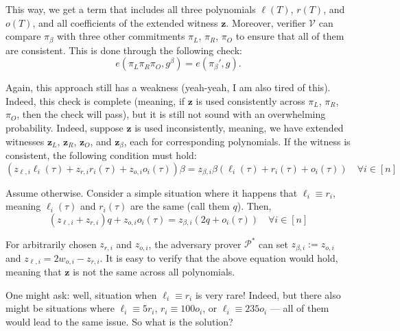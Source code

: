 \documentclass[../../book.tex]{subfiles}
\begin{document}
This way, we get a term that includes all three polynomials $\ell(T)$, $r(T)$, and $o(T)$, and all coefficients of the extended witness $\mathbf{z}$. Moreover, verifier $\mathcal{V}$ can compare $\pi_{\beta}$ with three other commitments $\pi_L$, $\pi_R$, $\pi_O$ to ensure that all of them are consistent. This is done through the following check:
\begin{equation*}
    e(\pi_L\pi_R\pi_O, g^{\beta}) = e(\pi_{\beta}', g).
\end{equation*}

Again, this approach still has a weakness (yeah-yeah, I am also tired of this). Indeed, this check is complete (meaning, if $\mathbf{z}$ is used consistently across $\pi_L$, $\pi_R$, $\pi_O$, then the check will pass), but it is still not sound with an overwhelming probability. Indeed, suppose $\mathbf{z}$ is used inconsistently, meaning, we have extended witnesses $\mathbf{z}_L$, $\mathbf{z}_R$, $\mathbf{z}_O$, and $\mathbf{z}_{\beta}$, each for corresponding polynomials. If the witness is consistent, the following condition must hold:
\begin{equation*}
    (z_{\ell,i}\ell_i(\tau) + z_{r,i}r_i(\tau) + z_{o,i}o_i(\tau))\beta = z_{\beta,i}\beta(\ell_i(\tau) + r_i(\tau) + o_i(\tau)) \quad \forall i \in [n]
\end{equation*}

Assume otherwise. Consider a simple situation where it happens that $\ell_i \equiv r_i$, meaning $\ell_i(\tau)$ and $r_i(\tau)$ are the same (call them $q$). Then,
\begin{equation*}
    (z_{\ell,i} + z_{r,i})q + z_{o,i}o_i(\tau)= z_{\beta,i}(2q + o_i(\tau)) \quad \forall i \in [n]
\end{equation*}

For arbitrarily chosen $z_{r,i}$ and $z_{o,i}$, the adversary prover $\mathcal{P}^*$ can set $z_{\beta,i} := z_{o,i}$ and $z_{\ell,i}=2w_{o,i} - z_{r,i}$. It is easy to verify that the above equation would hold, meaning that $\mathbf{z}$ is not the same across all polynomials. 

One might ask: well, situation when $\ell_i \equiv r_i$ is very rare! Indeed, but there also might be situations where $\ell_i \equiv 5r_i$, $r_i \equiv 100o_i$, or $\ell_i \equiv 235o_i$ --- all of them would lead to the same issue. So what is the solution? 
\end{document}
